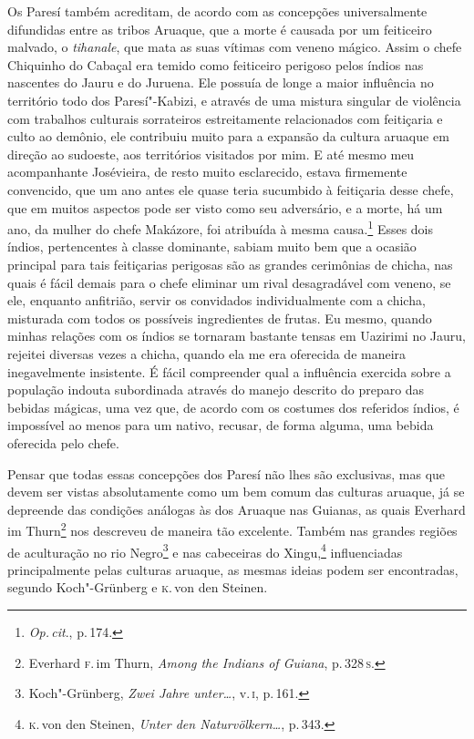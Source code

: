 Os Paresí também acreditam, de acordo com as concepções universalmente
difundidas entre as tribos Aruaque, que a morte é causada por um
feiticeiro malvado, o \textit{tihanale}, que mata as suas vítimas com
veneno mágico. Assim o chefe Chiquinho do Cabaçal era temido como
feiticeiro perigoso pelos índios nas nascentes do Jauru e do Juruena.
Ele possuía de longe a maior influência no território todo dos
Paresí"-Kabizi, e através de uma mistura singular de violência com
trabalhos culturais sorrateiros estreitamente relacionados com
feitiçaria e culto ao demônio, ele contribuiu muito para a expansão da
cultura aruaque em direção ao sudoeste, aos territórios visitados por
mim. E até mesmo meu acompanhante Josévieira, de resto muito
esclarecido, estava firmemente convencido, que um ano antes ele quase
teria sucumbido à feitiçaria desse chefe, que em muitos aspectos pode
ser visto como seu adversário, e a morte, há um ano, da mulher do chefe
Makázore, foi atribuída à mesma causa.\footnote{\textit{Op.\,cit}., p.\,174.} Esses dois índios, pertencentes à classe dominante, sabiam
muito bem que a ocasião principal para tais feitiçarias perigosas são
as grandes cerimônias de chicha, nas quais é fácil demais para o chefe
eliminar um rival desagradável com veneno, se ele, enquanto anfitrião,
servir os convidados individualmente com a chicha, misturada com todos
os possíveis ingredientes de frutas. Eu mesmo, quando minhas relações
com os índios se tornaram bastante tensas em Uazirimi no Jauru,
rejeitei diversas vezes a chicha, quando ela me era oferecida de
maneira inegavelmente insistente. É fácil compreender qual a influência
exercida sobre a população indouta subordinada através do manejo
descrito do preparo das bebidas mágicas, uma vez que, de acordo com os
costumes dos referidos índios, é impossível ao menos para um nativo,
recusar, de forma alguma, uma bebida oferecida pelo chefe.

Pensar que todas essas concepções dos Paresí não lhes são exclusivas,
mas que devem ser vistas absolutamente como um bem comum das culturas
aruaque, já se depreende das condições análogas às dos Aruaque nas
Guianas, as quais Everhard im Thurn\footnote{Everhard \textsc{f}.\,im Thurn,
  \textit{Among the Indians of Guiana}, p.\,328\,\textsc{s}.} nos descreveu de
maneira tão excelente. Também nas grandes regiões de aculturação no rio
Negro\footnote{Koch"-Grünberg, \textit{Zwei Jahre unter\ldots}, v.\,\textsc{i}, p.\,161.} e nas cabeceiras do Xingu,\footnote{\textsc{k}.\,von den
  Steinen, \textit{Unter den Naturvölkern\ldots}, p.\,343.}
influenciadas principalmente pelas culturas aruaque, as mesmas ideias
podem ser encontradas, segundo Koch"-Grünberg e \textsc{k}.\,von den Steinen.

